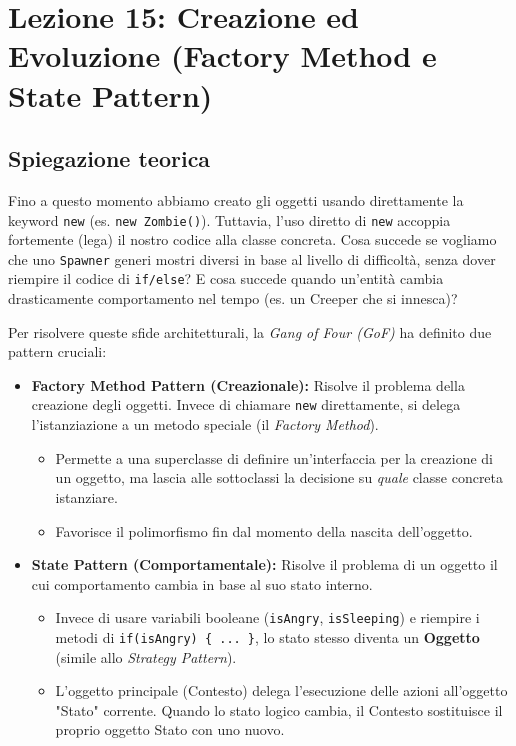 \documentclass[12pt, a4paper]{article}
\begin{document}
\section{Lezione 15: Creazione ed Evoluzione (Factory Method e State Pattern)}

\subsection{Spiegazione teorica}
Fino a questo momento abbiamo creato gli oggetti usando direttamente la keyword \texttt{new} (es. \texttt{new Zombie()}). Tuttavia, l'uso diretto di \texttt{new} accoppia fortemente (lega) il nostro codice alla classe concreta. Cosa succede se vogliamo che uno \texttt{Spawner} generi mostri diversi in base al livello di difficoltà, senza dover riempire il codice di \texttt{if/else}? E cosa succede quando un'entità cambia drasticamente comportamento nel tempo (es. un Creeper che si innesca)?

Per risolvere queste sfide architetturali, la \textit{Gang of Four (GoF)} ha definito due pattern cruciali:

\begin{itemize}
    \item \textbf{Factory Method Pattern (Creazionale):} Risolve il problema della creazione degli oggetti. Invece di chiamare \texttt{new} direttamente, si delega l'istanziazione a un metodo speciale (il \textit{Factory Method}). 
    \begin{itemize}
        \item Permette a una superclasse di definire un'interfaccia per la creazione di un oggetto, ma lascia alle sottoclassi la decisione su \textit{quale} classe concreta istanziare.
        \item Favorisce il polimorfismo fin dal momento della nascita dell'oggetto.
    \end{itemize}

    \item \textbf{State Pattern (Comportamentale):} Risolve il problema di un oggetto il cui comportamento cambia in base al suo stato interno. 
    \begin{itemize}
        \item Invece di usare variabili booleane (\texttt{isAngry}, \texttt{isSleeping}) e riempire i metodi di \texttt{if(isAngry) \{ ... \}}, lo stato stesso diventa un \textbf{Oggetto} (simile allo \textit{Strategy Pattern}).
        \item L'oggetto principale (Contesto) delega l'esecuzione delle azioni all'oggetto "Stato" corrente. Quando lo stato logico cambia, il Contesto sostituisce il proprio oggetto Stato con uno nuovo.
    \end{itemize}
\end{itemize}
\end{document}
